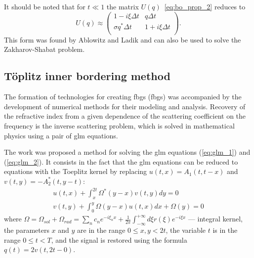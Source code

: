 It should be noted that for $ t \ll 1 $ the matrix $ U (q) $~\ref{eq:bo_prop_2} reduces to
\begin{equation}
    U(q) \approx
    \begin{pmatrix}
        1 - i\xi \Delta t & q \Delta t \\
        \sigma q^{*} \Delta t & 1 + i \xi \Delta t \\
    \end{pmatrix} {.}
\end{equation}
This form was found by Ablowitz and Ladik \cite{ablowitz1975, ablowitz1976} and can also be used to solve the Zakharov-Shabat problem.


\subsection{T\"oplitz inner bordering method}

The formation of technologies for creating \acrlong{fbg}s (\acrshort{fbg}s) \cite{agrawal2002, kashyap1999} was accompanied by the development of numerical methods for their modeling and analysis. Recovery of the refractive index from a given dependence of the scattering coefficient on the frequency is the inverse scattering problem, which is solved in mathematical physics using a pair of \acrlong{glm} \cite{zakharov1972exact} equations.

The work \cite{belai2007} was proposed a method for solving the \acrshort{glm} equations (\ref{eq:glm_1}) and (\ref{eq:glm_2}). It consists in the fact that the \acrshort{glm} equations can be reduced to equations with the Toeplitz kernel by replacing $u(t,x) = A_1(t,t-x)$ and $v(t,y) = -A^{*}_2(t,y-t)$:
\begin{eqnarray}
    u(t,x)+\int_{x}^{2t} \Omega^{*}(y-x) v(t,y) dy = 0 \nonumber \\
    v(t,y)+\int_{0}^{y} \Omega(y-x) u(t,x) dx + \Omega(y) = 0
    \label{eq:glm_tib}
\end{eqnarray}
where $\Omega = \Omega_{sol} + \Omega_{rad} =  \sum_{n} c_n e^{-i \xi_n x} +
\frac{1}{2\pi} \int_{-\infty}^{+\infty} d\xi r(\xi) e^{-i \xi x}$ --- integral kernel, 
the parameters $ x $ and $ y $ are in the range $ 0 \leq x {,} y <2t $, the variable $ t $ is in the range $ 0 \leq t <T $, and the signal is restored using the formula $ q (t) = 2 v (t, 2t-0) $.

